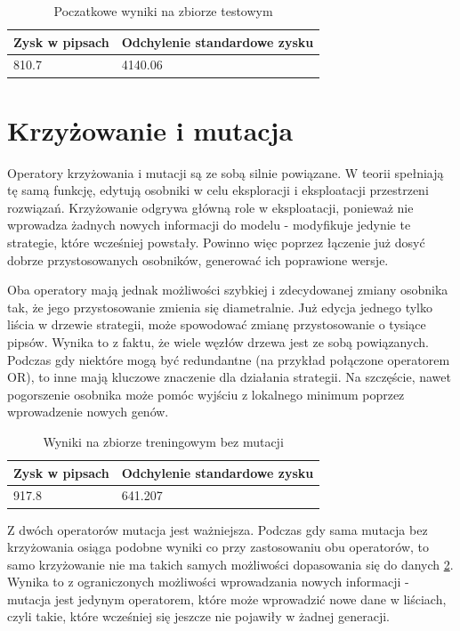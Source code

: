 \documentclass[twoside]{iisthesis}
\begin{document}
\begin{table}
\center
\caption{Poczatkowe wyniki na zbiorze testowym}
\label{wyniki1test}
\begin{tabular}{|l|l|}
  \hline
  Zysk w pipsach& Odchylenie standardowe zysku\\
  \hline
810.7 & 4140.06 \\
  \hline
\end{tabular} 
\end{table}

\section{Krzyżowanie i mutacja}

Operatory krzyżowania i mutacji są ze sobą silnie powiązane. W teorii spełniają tę samą funkcję, edytują osobniki w celu eksploracji i eksploatacji przestrzeni rozwiązań. Krzyżowanie odgrywa główną role w eksploatacji, ponieważ nie wprowadza żadnych nowych informacji do modelu - modyfikuje jedynie te strategie, które wcześniej powstały. Powinno więc poprzez łączenie już dosyć dobrze przystosowanych osobników, generować ich poprawione wersje. 

Oba operatory mają jednak możliwości szybkiej i zdecydowanej zmiany osobnika tak, że jego przystosowanie zmienia się diametralnie. Już edycja jednego tylko liścia w drzewie strategii, może spowodować zmianę przystosowanie o tysiące pipsów. Wynika to z faktu, że wiele węzłów drzewa jest ze sobą powiązanych. Podczas gdy niektóre mogą być redundantne (na przykład połączone operatorem OR), to inne mają kluczowe znaczenie dla działania strategii. Na szczęście, nawet pogorszenie osobnika może pomóc wyjściu z lokalnego minimum poprzez wprowadzenie nowych genów.


\begin{table}[h]
\center
\caption{Wyniki na zbiorze treningowym bez mutacji}
\label{wynikiBezMutacji}
\begin{tabular}{|l|l|}
  \hline
  Zysk w pipsach & Odchylenie standardowe zysku\\
  \hline
917.8 & 641.207 \\
  \hline
\end{tabular} 
\end{table}

Z dwóch operatorów mutacja jest ważniejsza. Podczas gdy sama mutacja bez krzyżowania osiąga podobne wyniki co przy zastosowaniu obu operatorów, to samo krzyżowanie nie ma takich samych możliwości dopasowania się do danych \ref{wynikiBezMutacji}. Wynika to z ograniczonych możliwości wprowadzania nowych informacji - mutacja jest jedynym operatorem, które może wprowadzić nowe dane w liściach, czyli takie, które wcześniej się jeszcze nie pojawiły w żadnej generacji.
\end{document}
